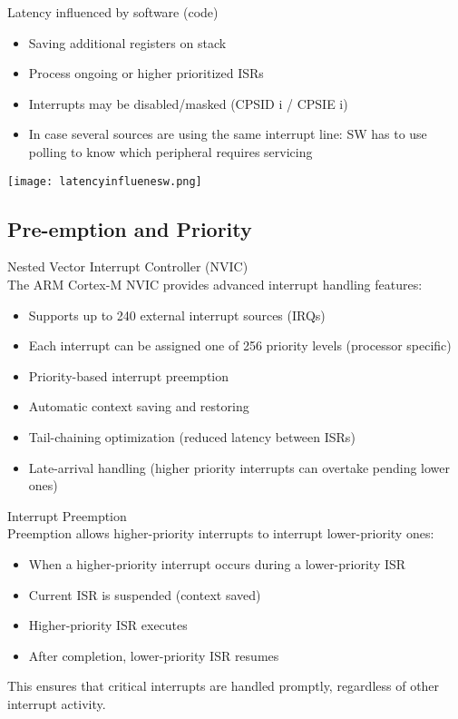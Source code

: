 \begin{theorem}{Latency influenced by software (code)}
    \begin{itemize}
        \item Saving additional registers on stack
        \item Process ongoing or higher prioritized ISRs
        \item Interrupts may be disabled/masked (CPSID i / CPSIE i)
        \item In case several sources are using the same interrupt line: SW has to use polling to know which peripheral requires servicing
    \end{itemize}
    \texttt{[image: latencyinfluenesw.png]}
\end{theorem}

\raggedcolumns
\columnbreak

\subsection{Pre-emption and Priority}

\begin{concept}{Nested Vector Interrupt Controller (NVIC)}\\
The ARM Cortex-M NVIC provides advanced interrupt handling features:
\begin{itemize}
    \item Supports up to 240 external interrupt sources (IRQs)
    \item Each interrupt can be assigned one of 256 priority levels (processor specific)
    \item Priority-based interrupt preemption
    \item Automatic context saving and restoring
    \item Tail-chaining optimization (reduced latency between ISRs)
    \item Late-arrival handling (higher priority interrupts can overtake pending lower ones)
\end{itemize}
\end{concept}

\begin{definition}{Interrupt Preemption}\\
Preemption allows higher-priority interrupts to interrupt lower-priority ones:
\begin{itemize}
    \item When a higher-priority interrupt occurs during a lower-priority ISR
    \item Current ISR is suspended (context saved)
    \item Higher-priority ISR executes
    \item After completion, lower-priority ISR resumes
\end{itemize}
This ensures that critical interrupts are handled promptly, regardless of other interrupt activity.
\end{definition}

